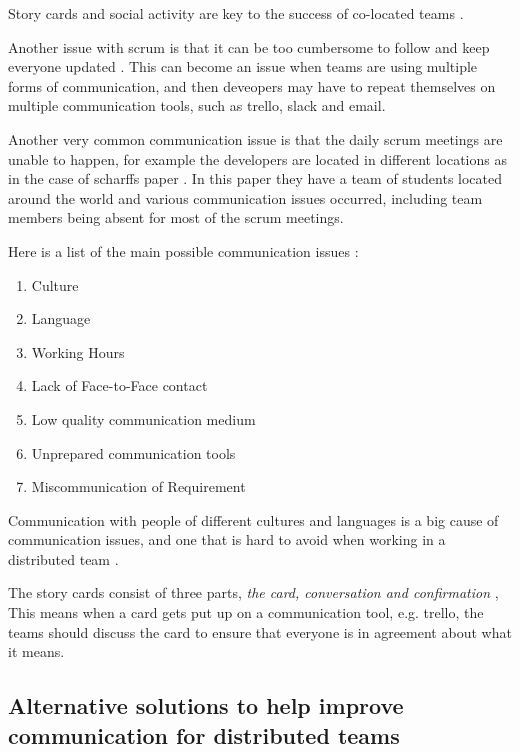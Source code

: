 \documentclass{scrartcl}
\begin{document}
 Story cards and social activity are key to the success of co-located teams \cite{abdullah2011}. \par

Another issue with scrum is that it can be too cumbersome to follow and keep everyone updated \cite{scharff2012}. This can become an issue when teams are using multiple forms of communication, and then deveopers may have to repeat themselves on multiple communication tools, such as trello, slack and email. \par

Another very common communication issue is that the daily scrum meetings are unable to happen, for example the developers are located in different locations as in the case of scharffs paper \cite{scharff2012}. In this paper they have a team of students located around the world and various communication issues occurred, including team members being absent for most of the scrum meetings. 

Here is a list of the main possible communication issues \cite{joshi2013}: 

\begin{enumerate}
\item Culture
\item Language
\item Working Hours
\item Lack of Face-to-Face contact
\item Low quality communication medium
\item Unprepared communication tools
\item Miscommunication of Requirement
\end{enumerate}

Communication with people of different cultures and languages is a big cause of communication issues, and one that is hard to avoid when working in a distributed team \cite{cohn2003}.

The story cards consist of three parts, \textit{the card, conversation and confirmation} \cite{abdullah2011}, This means when a card gets put up on a communication tool, e.g. trello, the teams should discuss the card to ensure that everyone is in agreement about what it means. 





\subsection{Alternative solutions to help improve communication for distributed teams}
\end{document}

